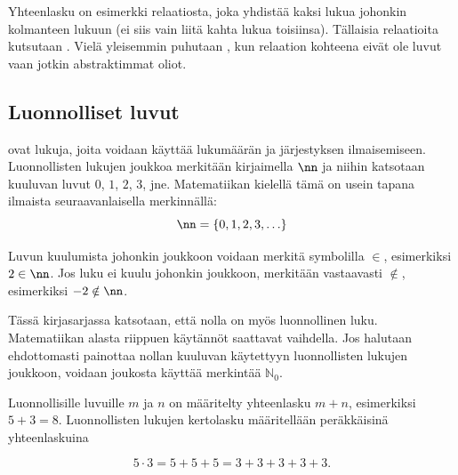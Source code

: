 \begin{esimerkki}
\end{esimerkki}

Yhteenlasku on esimerkki relaatiosta, joka yhdistää kaksi lukua johonkin kolmanteen lukuun (ei siis vain liitä kahta lukua toisiinsa). Tällaisia relaatioita kutsutaan . Vielä yleisemmin puhutaan , kun relaation kohteena eivät ole luvut vaan jotkin abstraktimmat oliot.

\subsection*{Luonnolliset luvut}

 ovat lukuja, joita voidaan käyttää lukumäärän ja järjestyksen ilmaisemiseen. Luonnollisten lukujen joukkoa merkitään kirjaimella $\nn$ ja niihin katsotaan kuuluvan luvut $0$, $1$, $2$, $3$, jne. Matematiikan kielellä tämä on usein tapana ilmaista seuraavanlaisella merkinnällä: \[\nn = \{0, 1, 2, 3, \ldots\}\]

Luvun kuulumista johonkin joukkoon voidaan merkitä symbolilla $\in$, esimerkiksi $2 \in \nn$. Jos luku ei kuulu johonkin joukkoon, merkitään vastaavasti $\notin$, esimerkiksi
$-2 \notin \nn$.

Tässä kirjasarjassa katsotaan, että nolla on myös luonnollinen luku. Matematiikan alasta riippuen käytännöt saattavat vaihdella. Jos halutaan ehdottomasti painottaa nollan kuuluvan käytettyyn luonnollisten lukujen joukkoon, voidaan joukosta käyttää merkintää $\mathbb{N}_0$.

Luonnollisille luvuille $m$ ja $n$ on määritelty yhteenlasku $m + n$, esimerkiksi $5 + 3 = 8$. Luonnollisten lukujen kertolasku määritellään peräkkäisinä yhteenlaskuina

\[5 \cdot 3 = 5 + 5 + 5 = 3 + 3 + 3 + 3 + 3.\]

